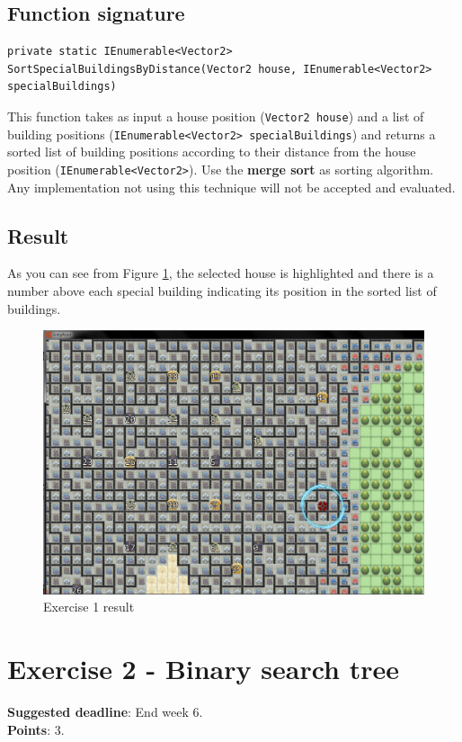 \documentclass[10pt,a4paper]{article}
\begin{document}
\subsection*{Function signature} 
\begin{lstlisting}
private static IEnumerable<Vector2> SortSpecialBuildingsByDistance(Vector2 house, IEnumerable<Vector2> specialBuildings)
\end{lstlisting}

This function takes as input a house position (\texttt{Vector2 house}) and a list of building positions (\texttt{IEnumerable<Vector2> specialBuildings}) and returns a sorted list of building positions according to their distance from the house position (\texttt{IEnumerable<Vector2>}). Use the \textbf{merge sort} as sorting algorithm. Any implementation not using this technique will not be accepted and evaluated.\\

\subsection*{Result}
As you can see from Figure \ref{img:Ex1}, the selected house is highlighted and there is a number above each special building indicating its position in the sorted list of buildings. 

\begin{figure}[!h]
\centering
\includegraphics[scale=0.25]{img/exercise1}
\caption{Exercise 1 result}
\label{img:Ex1}
\end{figure}

\newpage
\section*{Exercise 2 - Binary search tree}
\textbf{Suggested deadline}: End week 6. \\
\textbf{Points}: 3.
\end{document}
